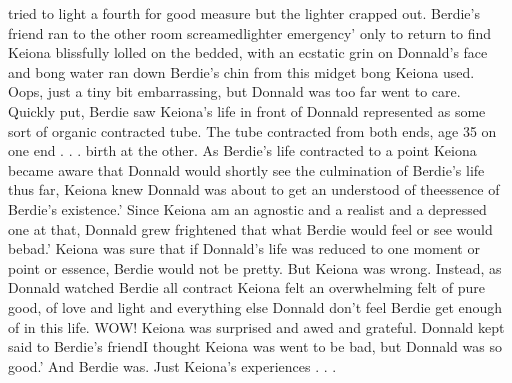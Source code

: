 \documentclass[12pt]{book}
\begin{document}
tried to light a fourth for good measure but the lighter crapped out. Berdie's friend ran to the other room screamedlighter emergency' only to return to find Keiona blissfully lolled on the bedded, with an ecstatic grin on Donnald's face and bong water ran down Berdie's chin from this midget bong Keiona used. Oops, just a tiny bit embarrassing, but Donnald was too far went to care. Quickly put, Berdie saw Keiona's life in front of Donnald represented as some sort of organic contracted tube. The tube contracted from both ends, age 35 on one end . . .  birth at the other. As Berdie's life contracted to a point Keiona became aware that Donnald would shortly see the culmination of Berdie's life thus far, Keiona knew Donnald was about to get an understood of theessence of Berdie's existence.' Since Keiona am an agnostic and a realist and a depressed one at that, Donnald grew frightened that what Berdie would feel or see would bebad.' Keiona was sure that if Donnald's life was reduced to one moment or point or essence, Berdie would not be pretty. But Keiona was wrong. Instead, as Donnald watched Berdie all contract Keiona felt an overwhelming felt of pure good, of love and light and everything else Donnald don't feel Berdie get enough of in this life. WOW! Keiona was surprised and awed and grateful. Donnald kept said to Berdie's friendI thought Keiona was went to be bad, but Donnald was so good.' And Berdie was. Just Keiona's experiences . . . 
\end{document}
